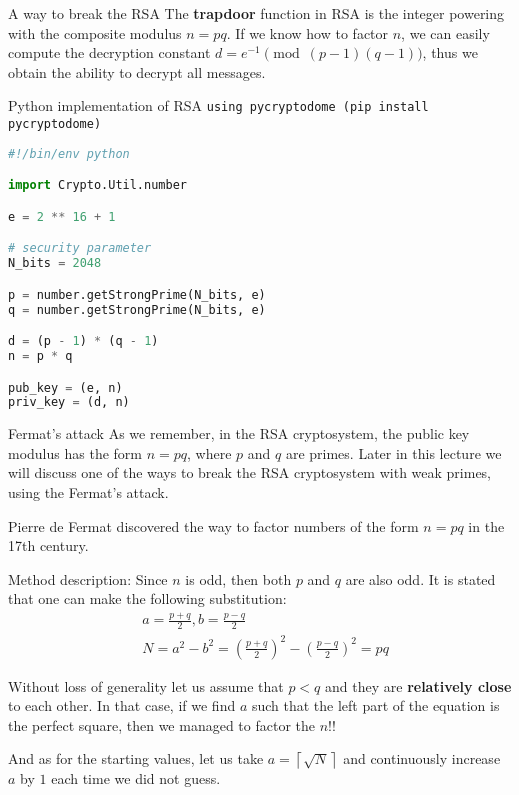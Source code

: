 \documentclass{beamer}
\begin{document}
\begin{frame}{A way to break the RSA}
    The \textbf{trapdoor} function in RSA is the integer powering with the 
    composite modulus $n = pq$. If we know how to factor $n$, we can easily
    compute the decryption constant $d = e^{-1} \pmod {(p - 1) (q - 1)}$, thus
    we obtain the ability to decrypt all messages.
\end{frame}

\begin{frame}[fragile]{Python implementation of RSA}
    \texttt{using pycryptodome (pip install pycryptodome)}
    \begin{lstlisting}[language=Python]
#!/bin/env python

import Crypto.Util.number

e = 2 ** 16 + 1

# security parameter
N_bits = 2048

p = number.getStrongPrime(N_bits, e)
q = number.getStrongPrime(N_bits, e)

d = (p - 1) * (q - 1)
n = p * q

pub_key = (e, n)
priv_key = (d, n)

        \end{lstlisting}
\end{frame}

\begin{frame}[allowframebreaks]{Fermat's attack}
    As we remember, in the RSA cryptosystem, the public key modulus has the form
    $n = pq$, where $p$ and $q$ are primes. Later in this lecture we will 
    discuss one of the ways to break the RSA cryptosystem with weak primes, 
    using the Fermat's attack.
    
    Pierre de Fermat discovered the way to factor numbers of the form $n = pq$
    in the 17th century.  

    Method description:
    Since $n$ is odd, then both $p$ and $q$ are also odd. It is stated that one
    can make the following substitution:
    \begin{eqnarray*}
        & a = \frac{p + q}{2}, b = \frac{p - q}{2} \\
        & N = a^2 - b^2 = \left(\frac{p + q}{2}\right)^2 - 
                          \left(\frac{p - q}{2}\right)^2 = pq
    \end{eqnarray*}

    Without loss of generality let us assume that $p < q$ and they are 
    \textbf{relatively close} to each other. In that case, if we find $a$ such 
    that the left part of the equation is the perfect square, then we managed to
    factor the $n$!!

    And as for the starting values, let us take 
    $a = \left\lceil \sqrt{N} \right\rceil$ and continuously increase $a$ by $1$
    each time we did not guess.
\end{frame}
\end{document}
